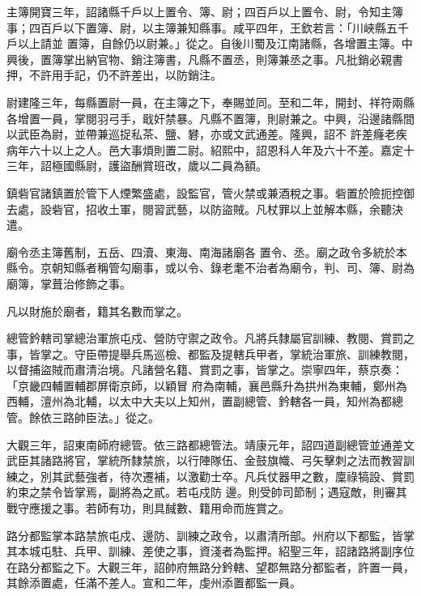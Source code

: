 \begin{pinyinscope}
 主簿開寶三年，詔諸縣千戶以上置令、簿、尉；四百戶以上置令、尉，令知主簿事；四百戶以下置簿、尉，以主簿兼知縣事。咸平四年，王欽若言：「川峽縣五千戶以上請並
 置簿，自餘仍以尉兼。」從之。自後川蜀及江南諸縣，各增置主簿。中興後，置簿掌出納官物、銷注簿書，凡縣不置丞，則簿兼丞之事。凡批銷必親書押，不許用手記，仍不許差出，以防銷注。



 尉建隆三年，每縣置尉一員，在主簿之下，奉賜並同。至和二年，開封、祥符兩縣各增置一員，掌閱羽弓手，戢奸禁暴。凡縣不置簿，則尉兼之。中興，沿邊諸縣間以武臣為尉，並帶兼巡捉私茶、鹽、礬，亦或文武通差。隆興，詔不
 許差癃老疾病年六十以上之人。邑大事煩則置二尉。紹熙中，詔恩科人年及六十不差。嘉定十三年，詔極國縣尉，護盜酬賞班改，歲以二員為額。



 鎮砦官諸鎮置於管下人煙繁盛處，設監官，管火禁或兼酒稅之事。砦置於險扼控御去處，設砦官，招收土軍，閱習武藝，以防盜賊。凡杖罪以上並解本縣，余聽決遣。



 廟令丞主簿舊制，五岳、四瀆、東海、南海諸廟各
 置令、丞。廟之政令多統於本縣令。京朝知縣者稱管勾廟事，或以令、錄老耄不治者為廟令，判、司、簿、尉為廟簿，掌葺治修飾之事。



 凡以財施於廟者，籍其名數而掌之。



 總管鈐轄司掌總治軍旅屯戍、營防守禦之政令。凡將兵隸屬官訓練、教閱、賞罰之事，皆掌之。守臣帶提舉兵馬巡檢、都監及提轄兵甲者，掌統治軍旅、訓練教閱，以督捕盜賊而肅清治境。凡諸營名籍、賞罰之事，皆掌之。崇寧四年，蔡京奏：「京畿四輔置輔郡屏衛京師，以穎冒
 府為南輔，襄邑縣升為拱州為東輔，鄭州為西輔，澶州為北輔，以太中大夫以上知州，置副總管、鈐轄各一員，知州為都總管。餘依三路帥臣法。」從之。



 大觀三年，詔東南師府總管。依三路都總管法。靖康元年，詔四道副總管並通差文武臣其諸路將官，掌統所隸禁旅，以行陣隊伍、金鼓旗幟、弓矢擊刺之法而教習訓練之，別其武藝強者，待次遷補，以激勸士卒。凡兵仗器甲之數，廩祿犒設、賞罰約束之禁令皆掌焉，副將為之貳。若屯戍防
 邊。則受帥司節制；遇寇敵，則審其戰守應援之事。若師有功，則具馘數、籍用命而旌賞之。



 路分都監掌本路禁旅屯戍、邊防、訓練之政令，以肅清所部。州府以下都監，皆掌其本城屯駐、兵甲、訓練、差使之事，資淺者為監押。紹聖三年，詔諸路將副序位在路分都監之下。大觀三年，詔帥府無路分鈐轄、望郡無路分都監者，許置一員，其餘添置處，任滿不差人。宣和二年，虔州添置都監一員。




\end{pinyinscope}
